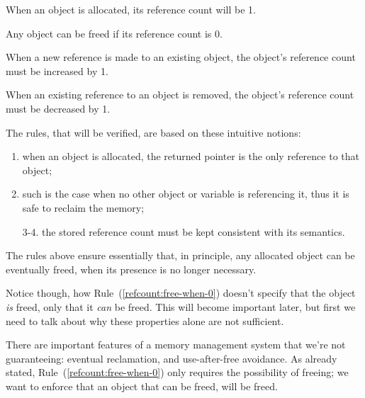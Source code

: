 \begin{myrule}\label{refcount:allocate-1}
	When an object is allocated, its reference count will be 1.
\end{myrule}

\begin{myrule}\label{refcount:free-when-0}
	Any object can be freed if its reference count is 0.
\end{myrule}

\begin{myrule}\label{refcount:incref}
	When a new reference is made to an existing object, the object's reference count must be increased by 1.
\end{myrule}

\begin{myrule}\label{refcount:decref}
	When an existing reference to an object is removed, the object's reference count must be decreased by 1.
\end{myrule}

The rules, that will be verified, are based on these intuitive notions:
\begin{enumerate}
	\item when an object is allocated, the returned pointer is the only reference to that object;
	\item such is the case when no other object or variable is referencing it, thus it is safe to reclaim the memory;
	\item[3-4.] the stored reference count must be kept consistent with its semantics.
\end{enumerate}

The rules above ensure essentially that, in principle, any allocated object can be eventually freed, when its presence is no longer necessary.

Notice though, how Rule~(\ref{refcount:free-when-0}) doesn't specify that the object \emph{is} freed, only that it \emph{can} be freed.
This will become important later, but first we need to talk about why these properties alone are not sufficient.

There are important features of a memory management system that we're not guaranteeing: eventual reclamation, and use-after-free avoidance.
As already stated, Rule~(\ref{refcount:free-when-0}) only requires the possibility of freeing; we want to enforce that an object that can be freed, will be freed.

